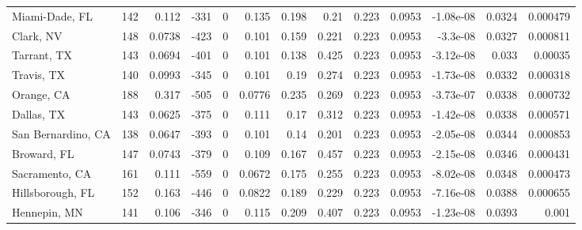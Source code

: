 \documentclass[12pt,letterpaper]{article}
\begin{document}
\begin{sidewaystable}
{\begin{tabular}{lrrrrrrrrrrrr}
 Miami-Dade, FL     & 142   & 0.112   &  -331 &     0 &          0.135  &            0.198 &         0.21   &        0.223 &       0.0953 &        -1.08e-08 &           0.0324  &        0.000479 \\
 Clark, NV          & 148   & 0.0738  &  -423 &     0 &          0.101  &            0.159 &         0.221  &        0.223 &       0.0953 &        -3.3e-08  &           0.0327  &        0.000811 \\
 Tarrant, TX        & 143   & 0.0694  &  -401 &     0 &          0.101  &            0.138 &         0.425  &        0.223 &       0.0953 &        -3.12e-08 &           0.033   &        0.00035  \\
 Travis, TX         & 140   & 0.0993  &  -345 &     0 &          0.101  &            0.19  &         0.274  &        0.223 &       0.0953 &        -1.73e-08 &           0.0332  &        0.000318 \\
 Orange, CA         & 188   & 0.317   &  -505 &     0 &          0.0776 &            0.235 &         0.269  &        0.223 &       0.0953 &        -3.73e-07 &           0.0338  &        0.000732 \\
 Dallas, TX         & 143   & 0.0625  &  -375 &     0 &          0.111  &            0.17  &         0.312  &        0.223 &       0.0953 &        -1.42e-08 &           0.0338  &        0.000571 \\
 San Bernardino, CA & 138   & 0.0647  &  -393 &     0 &          0.101  &            0.14  &         0.201  &        0.223 &       0.0953 &        -2.05e-08 &           0.0344  &        0.000853 \\
 Broward, FL        & 147   & 0.0743  &  -379 &     0 &          0.109  &            0.167 &         0.457  &        0.223 &       0.0953 &        -2.15e-08 &           0.0346  &        0.000431 \\
 Sacramento, CA     & 161   & 0.111   &  -559 &     0 &          0.0672 &            0.175 &         0.255  &        0.223 &       0.0953 &        -8.02e-08 &           0.0348  &        0.000473 \\
 Hillsborough, FL   & 152   & 0.163   &  -446 &     0 &          0.0822 &            0.189 &         0.229  &        0.223 &       0.0953 &        -7.16e-08 &           0.0388  &        0.000655 \\
 Hennepin, MN       & 141   & 0.106   &  -346 &     0 &          0.115  &            0.209 &         0.407  &        0.223 &       0.0953 &        -1.23e-08 &           0.0393  &        0.001    \\

\end{tabular}}
\end{sidewaystable}
\end{document}
